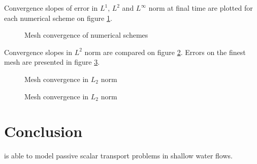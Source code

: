 Convergence slopes of error in $L^1$, $L^2$ and $L^\infty$ norm at final time
are plotted for each numerical scheme on figure \ref{t2d:flumetracer:mesh_convergence}.


\begin{figure}[h!]
\begin{minipage}[t]{0.50\textwidth}
 \centering
\end{minipage}%
\begin{minipage}[t]{0.50\textwidth}
 \centering
\end{minipage}
\begin{minipage}[t]{0.50\textwidth}
 \centering
\end{minipage}%
\begin{minipage}[t]{0.50\textwidth}
 \centering
\end{minipage}
\begin{minipage}[t]{0.50\textwidth}
 \centering
\end{minipage}%
\begin{minipage}[t]{0.50\textwidth}
 \centering
\end{minipage}
 \caption{Mesh convergence of numerical schemes}
 \label{t2d:flumetracer:mesh_convergence}
\end{figure}

Convergence slopes in $L^2$ norm are compared on figure \ref{t2d:flumetracer:error_slopes_allvars}.
Errors on the finest mesh are presented in figure \ref{t2d:flumetracer:error_finemesh}.

\begin{figure}[h!]
\centering
{}
\caption{Mesh convergence in $L_2$ norm}
\label{t2d:flumetracer:error_slopes_allvars}
\end{figure}

\begin{figure}[h!]
\centering
{}
\caption{Mesh convergence in $L_2$ norm}
\label{t2d:flumetracer:error_finemesh}
\end{figure}


\section{Conclusion}
 is able to model passive scalar transport problems in shallow water flows.



